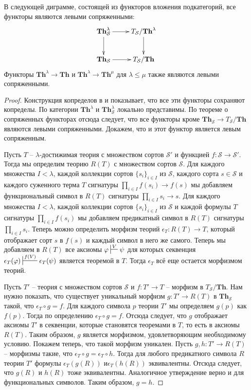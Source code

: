 \documentclass[reqno]{amsart}
\theoremstyle{definition}
\theoremstyle{remark}
\newcommand{\bcat}[1]{\mathbf{#1}}
\newcommand{\Th}{\bcat{Th}}
\begin{document}
\begin{prop}[th-adj]
В следующей диграмме, состоящей из функторов вложения подкатегорий, все функторы являются левыми сопряженными:
\[ \xymatrix{ \Th_\mathcal{S}^\lambda \ar[r] \ar[d] & T_\mathcal{S}/\Th^\lambda \ar[d] \\
              \Th_\mathcal{S}         \ar[r]        & T_\mathcal{S}/\Th
            } \]
Функторы $\Th^\lambda \to \Th$ и $\Th^\lambda \to \Th^\mu$ для $\lambda \leq \mu$ также являются левыми сопряженными.
\end{prop}
\begin{proof}
Конструкция копределов в  и  показывает, что все эти функторы сохраняют копределы.
По  категории $\Th^\lambda$ и $\Th_\mathcal{S}^\lambda$ локально представимы.
По теореме о сопряженных функторах отсюда следует, что все функторы кроме $\Th_\mathcal{S} \to T_\mathcal{S}/\Th$ являются левыми сопряженными.
Докажем, что и этот функтор является левым сопряженным.

Пусть $T$ -- $\lambda$-достижимая теория с множеством сортов $\mathcal{S}'$ и функцией $f : \mathcal{S} \to \mathcal{S'}$.
Тогда мы определим теорию $R(T)$ с множеством сортов $\mathcal{S}$.
Для каждого множества $I < \lambda$, каждой коллекции сортов $\{ s_i \}_{i \in I}$ из $\mathcal{S}$, каждого сорта $s \in \mathcal{S}$ и каждого суженного терма $T$ сигнатуры $\prod_{i \in I} f(s_i) \to f(s)$
мы добавляем функциональный символ в $R(T)$ сигнатуры $\prod_{i \in I} s_i \to s$.
Для каждого множества $I < \lambda$, каждой коллекции сортов $\{ s_i \}_{i \in I}$ из $\mathcal{S}$ и каждой формулы $T$ сигнатуры $\prod_{i \in I} f(s_i)$
мы добавляем предикатный символ в $R(T)$ сигнатуры $\prod_{i \in I} s_i$.
Теперь можно определить морфизм теорий $\epsilon_T : R(T) \to T$, который отображает сорт $s$ в $f(s)$ и каждый символ в него же самого.
Теперь мы добавляем в $R(T)$ все аксиомы $\varphi \sststile{}{V} \psi$ для которых секвенция $\epsilon_T(\varphi) \sststile{}{f(V)} \epsilon_T(\psi)$ является теоремой в $T$.
Тогда $\epsilon_T$ всё еще остается морфизмом теорий.

Пусть $T'$ -- теория с множеством сортов $\mathcal{S}$ и $f : T' \to T$ -- морфизм в $T_\mathcal{S}/\Th$.
Нам нужно показать, что существует уникальный морфизм $g : T' \to R(T)$ в $\Th_\mathcal{S}$ такой, что $\epsilon_T \circ g = f$.
Для каждого символа $p$ теории $T'$ мы определяем $g(p)$ как $f(p)$.
Тогда по определению $\epsilon_T \circ g = f$.
Отсюда следует, что $g$ отображает аксиомы $T'$ в секвенции, которые становятся теоремами в $T$, то есть в аксиомы $R(T)$.
Таким образом, $g$ является морфизмом, удовлетворяющим необходимому условию.
Покажем теперь, что такой морфизм уникален.
Пусть $g,h : T' \to R(T)$ -- морфизмы такие, что $\epsilon_T \circ g = \epsilon_T \circ h$.
Тогда для любого предикатного символа $R$ теории $T'$ формулы $\epsilon_T(g(R))$ и$\epsilon_T(h(R))$ эквивалентны.
Отсюда следует, что $g(R)$ и $h(R)$ тоже эквивалентны.
Аналогичное утверждение верно и для функциональных символов.
Таким образом, $g = h$.
\end{proof}
\end{document}
